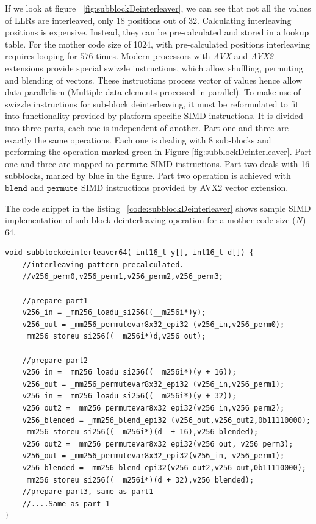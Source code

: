 If we look at figure ~\ref{fig:subblockDeinterleaver}, we can see that not all the values of LLRs are interleaved, only 18 positions out of 32. Calculating interleaving positions is expensive. Instead, they can be pre-calculated and stored in a lookup table. For the mother code size of 1024, with pre-calculated positions interleaving requires looping for $ 576 $ times. Modern processors with \textit{AVX} and \textit{AVX2} extensions provide special swizzle instructions, which allow shuffling, permuting and blending of vectors. These instructions process vector of values hence allow data-parallelism (Multiple data elements processed in parallel). To make use of swizzle instructions \cite{IntelIntrinsics} for sub-block deinterleaving, it must be reformulated to fit into functionality provided by platform-specific SIMD instructions. It is divided into three parts, each one is independent of another. Part one and three are exactly the same operations. Each one is dealing with 8 sub-blocks and performing the operation marked green in Figure \ref{fig:subblockDeinterleaver}. Part one and three are mapped to $\mathtt{permute}$ SIMD instructions. Part two deals with 16 subblocks, marked by blue in the figure. Part two operation is achieved with $\mathtt{blend}$ and $\mathtt{permute}$ SIMD instructions provided by AVX2 vector extension.

The code snippet in the listing ~\ref{code:subblockDeinterleaver} shows sample SIMD implementation of sub-block deinterleaving operation for a mother code size ($N$) 64.

\begin{code}
\label{code:subblockDeinterleaver}
\begin{verbatim}
void subblockdeinterleaver64( int16_t y[], int16_t d[]) {	
	//interleaving pattern precalculated.
	//v256_perm0,v256_perm1,v256_perm2,v256_perm3;	

	//prepare part1
	v256_in = _mm256_loadu_si256((__m256i*)y);
	v256_out = _mm256_permutevar8x32_epi32 (v256_in,v256_perm0);
	_mm256_storeu_si256((__m256i*)d,v256_out);
	
	//prepare part2
	v256_in = _mm256_loadu_si256((__m256i*)(y + 16));
	v256_out = _mm256_permutevar8x32_epi32 (v256_in,v256_perm1);
	v256_in = _mm256_loadu_si256((__m256i*)(y + 32));
	v256_out2 = _mm256_permutevar8x32_epi32(v256_in,v256_perm2);
	v256_blended = _mm256_blend_epi32 (v256_out,v256_out2,0b11110000);
	_mm256_storeu_si256((__m256i*)(d  + 16),v256_blended);
	v256_out2 = _mm256_permutevar8x32_epi32(v256_out, v256_perm3);
	v256_out = _mm256_permutevar8x32_epi32(v256_in, v256_perm1);
	v256_blended = _mm256_blend_epi32(v256_out2,v256_out,0b11110000);
	_mm256_storeu_si256((__m256i*)(d + 32),v256_blended);
	//prepare part3, same as part1
	//....Same as part 1
}
\end{verbatim}
\end{code}

